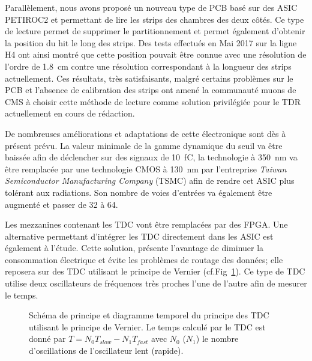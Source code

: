 Parallèlement, nous avons proposé un nouveau type de PCB basé sur des ASIC PETIROC2 et permettant de lire les strips des chambres des deux côtés. Ce type de lecture permet de supprimer le partitionnement et permet également d'obtenir la position du hit le long des strips. Des tests effectués en Mai \num{2017} sur la ligne H4 ont ainsi montré que cette position pouvait être connue avec une résolution de l'ordre de \SI{1.8}{\centi\meter} contre une résolution correspondant à la longueur des strips actuellement. Ces résultats, très satisfaisants, malgré certains problèmes sur le PCB et l'absence de calibration des strips ont amené la communauté muons de CMS à choisir cette méthode de lecture comme solution privilégiée pour le TDR actuellement en cours de rédaction.

De nombreuses améliorations et adaptations de cette électronique sont dès à présent prévu. La valeur minimale de la gamme dynamique du seuil va être baissée afin de déclencher sur des signaux de \SI{10}{\femto\coulomb}, la technologie  à \SI{350}{\nano\meter} va être remplacée par une technologie CMOS à \SI{130}{\nano\meter} par l'entreprise \textit{Taiwan Semiconductor Manufacturing Company} (TSMC) afin de rendre cet ASIC plus tolérant aux radiations. Son nombre de voies d'entrées va également être augmenté et passer de \num{32} à \num{64}.

Les mezzanines contenant les TDC vont être remplacées par des FPGA. Une alternative permettant d'intégrer les TDC directement dans les ASIC est également à l'étude. Cette solution, présente l'avantage de diminuer la consommation électrique et évite les problèmes de routage des données; elle reposera sur des TDC utilisant le principe de Vernier (cf.Fig~\ref{vernier}). Ce type de TDC utilise deux oscillateurs de fréquences très proches l'une de l'autre afin de mesurer le temps.

\begin{figure}[ht!]
	\centering
	\hfill
	\caption{Schéma de principe et diagramme temporel du principe des TDC utilisant le principe de Vernier. Le temps calculé par le TDC est donné par $T=N_0T_{slow}-N_1T_{fast}$ avec $N_0$ ($N_1$) le nombre d'oscillations de l'oscillateur lent (rapide).}
	\label{vernier}
\end{figure}

